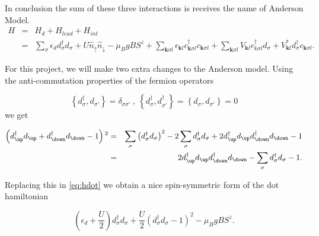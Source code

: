 In conclusion the sum of these three interactions is receives the name of Anderson Model. 
\begin{eqnarray}
H & = & H_{d}+H_{lead}+H_{int}\nonumber \\
 & = & \sum_{\sigma}\epsilon_{d}d_{\sigma}^{\dagger}d_{\sigma}+U\hat{n}_{\uparrow}\hat{n}_{\downarrow}-\mu_{B}gBS^{z}+\sum_{\mathbf{k}\sigma l}\epsilon_{\mathbf{k}l}c_{\mathbf{k}\sigma l}^{\dagger}c_{\mathbf{k}\sigma l}+\sum_{\mathbf{k}\sigma l}V_{\mathbf{k}l}c_{k\sigma l}^{\dagger}d_{\sigma}+V_{\mathbf{k}l}^{*}d_{\sigma}^{\dagger}c_{\mathbf{k}\sigma l}.\label{eq:Anderson}
\end{eqnarray}

For this project, we will make two extra changes to the Anderson model. Using the anti-commutation properties of the fermion operators

\[
\left\{ d_{\sigma}^{\dagger},d_{\sigma'}\right\} =\delta_{\sigma\sigma'}\ ,\ \left\{ d_{\sigma}^{\dagger},d_{\sigma'}^{\dagger}\right\} =\left\{ d_{\sigma},d_{\sigma'}\right\} =0
\]
we get


\begin{eqnarray*}
\left(d_{\up}^{\dagger}d_{\up}+d_{\down}^{\dagger}d_{\down}-1\right){}^{2} & = & \sum_{\sigma}\left(d_{\sigma}^{\dagger}d_{\sigma}\right)^{2}-2\sum_{\sigma}d_{\sigma}^{\dagger}d_{\sigma}+2d_{\up}^{\dagger}d_{\up}d_{\down}^{\dagger}d_{\down}-1\\
 & = & 2d_{\up}^{\dagger}d_{\up}d_{\down}^{\dagger}d_{\down}-\sum_{\sigma}d_{\sigma}^{\dagger}d_{\sigma}-1.
\end{eqnarray*}

Replacing this in \eqref{eq:hdot} we obtain a  nice spin-symmetric form of the dot hamiltonian

\begin{equation}
    \left(\epsilon_{d}+\frac{U}{2}\right)d_{\sigma}^{\dagger}d_{\sigma}+\frac{U}{2}(d_{\sigma}^{\dagger}d_{\sigma}-1)^{2}-\mu_{B}gBS^{z}. 
    \label{eq:hdot2}
\end{equation}

